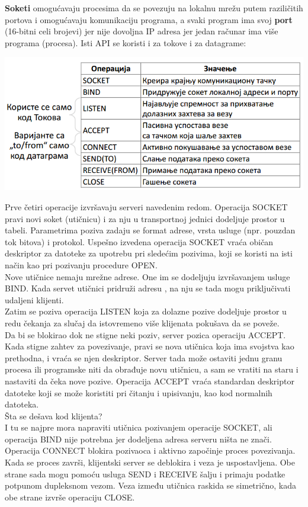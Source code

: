 \documentclass{article} %
\begin{document}
\textbf{Soketi} omogućavaju procesima da se povezuju na lokalnu mrežu putem raziličitih portova i omogućavaju komunikaciju  programa, a svaki program ima svoj \textbf{port} (16-bitni celi brojevi) jer nije dovoljna IP adresa jer jedan računar ima više programa (procesa). Isti API se koristi i za tokove i za datagrame:
\begin{center}
	\includegraphics[scale=0.5]{soketi}
\end{center}
Prve četiri operacije izvršavaju serveri navedenim redom. Operacija SOCKET pravi novi soket (utičnicu) i za nju u transportnoj jednici dodeljuje prostor u tabeli. Parametrima poziva zadaju se format adrese, vrsta usluge (npr. pouzdan tok bitova) i protokol. Uspešno izvedena operacija SOCKET vraća običan deskriptor za datoteke za upotrebu pri sledećim pozivima, koji se koristi na isti način kao pri pozivanju procedure OPEN.\\
Nove utičnice nemaju mrežne adrese. One im se dodeljuju izvršavanjem usluge BIND. Kada servet utičnici pridruži adresu , na nju se tada mogu priključivati udaljeni klijenti.\\
 Zatim se poziva operacija LISTEN koja za dolazne pozive dodeljuje prostor u redu čekanja za slučaj da istovremeno više klijenata pokušava da se poveže. \\
Da bi se blokirao dok ne stigne neki poziv, server pozica operaciju ACCEPT.  Kada stigne zahtev za povezivanje, pravi se nova utičnica koja ima svojstva kao prethodna, i vraća se njen deskriptor. Server tada može ostaviti jednu granu procesa ili programske niti da obrađuje novu utičnicu, a sam se vratiti na staru i nastaviti da čeka nove pozive. Operacija ACCEPT vraća standardan deskriptor datoteke koji se može koristiti pri čitanju i upisivanju, kao kod normalnih datoteka.\\

Šta se dešava kod klijenta?\\
I tu se najpre mora napraviti utičnica pozivanjem operacije SOCKET, ali operacija BIND nije potrebna jer dodeljena adresa serveru ništa ne znači. Operacija CONNECT blokira pozivaoca i aktivno započinje proces povezivanja. Kada se proces završi, klijentski server se deblokira i veza je uspostavljena. Obe strane sada mogu pomoću usluga SEND i RECEIVE šalju i primaju podatke potpunom dupleksnom vezom. Veza između utičnica raskida se simetrično, kada obe strane izvrše operaciju CLOSE.
\\
\end{document}
